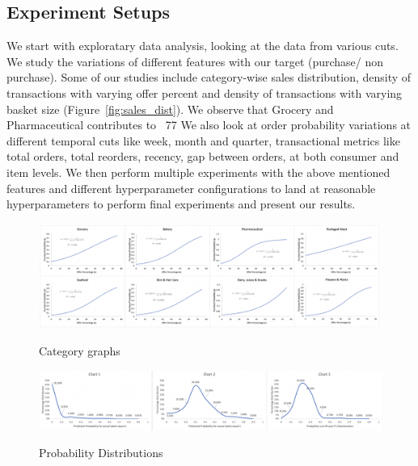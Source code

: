   \subsection{Experiment Setups}
We start with exploratary data analysis, looking at the data from various cuts. We
study the variations of different features with our target (purchase/ non purchase). Some of our studies include
category-wise sales distribution, density of transactions with varying offer percent 
and density of transactions with varying basket size (Figure~\ref{fig:sales_dist}).
We observe that Grocery and Pharmaceutical contributes to ~77%
We also look at order probability variations at different temporal cuts like week, month and quarter, transactional metrics 
like total orders, total reorders, recency, gap between orders, at both consumer and item levels.
We then perform multiple experiments with the above mentioned features and different hyperparameter 
configurations to land at reasonable hyperparameters to perform final experiments and present our results.
  \begin{figure}[hbt!]
    \centering 
    \caption{Category graphs} 
    \includegraphics[width=5.5in]{img/cat_curves.png} 
    \label{fig:cat_curves} 
  \end{figure}
 \begin{figure}[hbt!]
    \centering 
    \caption{Probability Distributions} 
    \includegraphics[width=5.5in]{img/prob_dist.png} 
    \label{fig:prob_dist} 
  \end{figure}
